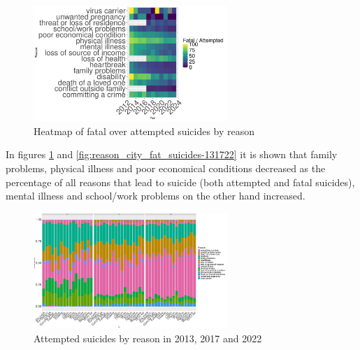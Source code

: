 \documentclass{article}
\begin{document}
\begin{figure}[H]
    \centering
    \includegraphics[width=0.65\textwidth]{imgs/reason_foa_heat.pdf}
    \caption{Heatmap of fatal over attempted suicides by reason }
\end{figure}
%
%
In figures \ref{fig:reason_city_att_suicides-131722} and \ref{fig:reason_city_fat_suicides-131722}
it is shown that family problems, physical illness and poor economical conditions 
decreased as the percentage of all reasons that lead to suicide (both attempted and fatal suicides),
mental illness and school/work problems on the other hand increased.
\begin{figure}[H]
    \centering
    \includegraphics[width=0.65\textwidth]{imgs/reason_city_att_suicides-131722.pdf}
    \caption{Attempted suicides by reason  in 2013, 2017 and 2022}
    \label{fig:reason_city_att_suicides-131722}
\end{figure}
\end{document}
